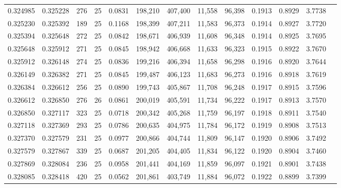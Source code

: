 \begin{tabular}{rrrrrrrrrrrrr}
0.324985 & 0.325228 &   276 &  25 &                                     0.0831 & 198,210 & 407,400 &  11,558 &  96,398 & 0.1913 & 0.8929 & 3.7738 \\
0.325230 & 0.325392 &   189 &  25 &                                     0.1168 & 198,399 & 407,211 &  11,583 &  96,373 & 0.1914 & 0.8927 & 3.7720 \\
0.325394 & 0.325648 &   272 &  25 &                                     0.0842 & 198,671 & 406,939 &  11,608 &  96,348 & 0.1914 & 0.8925 & 3.7695 \\
0.325648 & 0.325912 &   271 &  25 &                                     0.0845 & 198,942 & 406,668 &  11,633 &  96,323 & 0.1915 & 0.8922 & 3.7670 \\
0.325912 & 0.326148 &   274 &  25 &                                     0.0836 & 199,216 & 406,394 &  11,658 &  96,298 & 0.1916 & 0.8920 & 3.7644 \\
0.326149 & 0.326382 &   271 &  25 &                                     0.0845 & 199,487 & 406,123 &  11,683 &  96,273 & 0.1916 & 0.8918 & 3.7619 \\
0.326384 & 0.326612 &   256 &  25 &                                     0.0890 & 199,743 & 405,867 &  11,708 &  96,248 & 0.1917 & 0.8915 & 3.7596 \\
0.326612 & 0.326850 &   276 &  26 &                                     0.0861 & 200,019 & 405,591 &  11,734 &  96,222 & 0.1917 & 0.8913 & 3.7570 \\
0.326850 & 0.327117 &   323 &  25 &                                     0.0718 & 200,342 & 405,268 &  11,759 &  96,197 & 0.1918 & 0.8911 & 3.7540 \\
0.327118 & 0.327369 &   293 &  25 &                                     0.0786 & 200,635 & 404,975 &  11,784 &  96,172 & 0.1919 & 0.8908 & 3.7513 \\
0.327370 & 0.327579 &   231 &  25 &                                     0.0977 & 200,866 & 404,744 &  11,809 &  96,147 & 0.1920 & 0.8906 & 3.7492 \\
0.327579 & 0.327867 &   339 &  25 &                                     0.0687 & 201,205 & 404,405 &  11,834 &  96,122 & 0.1920 & 0.8904 & 3.7460 \\
0.327869 & 0.328084 &   236 &  25 &                                     0.0958 & 201,441 & 404,169 &  11,859 &  96,097 & 0.1921 & 0.8901 & 3.7438 \\
0.328085 & 0.328418 &   420 &  25 &                                     0.0562 & 201,861 & 403,749 &  11,884 &  96,072 & 0.1922 & 0.8899 & 3.7399 \\

\end{tabular}
